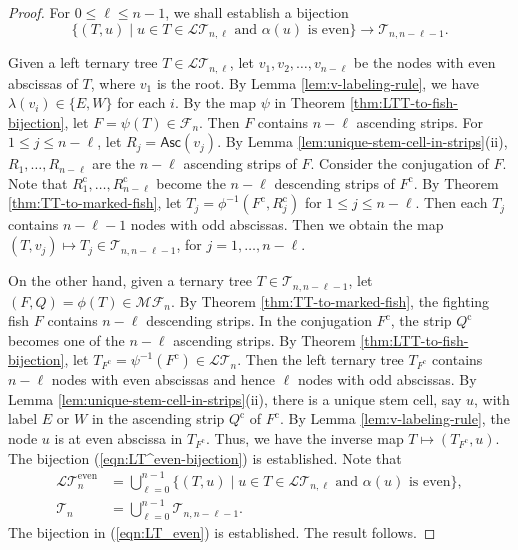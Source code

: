 \documentclass[10pt,a4paper]{amsart}
\newcommand{\Asc}{{\textsf{Asc}}}
\newcommand{\F}{{\mathcal{F}}}
\newcommand{\LT}{{\mathcal{LT}}}
\newcommand{\MF}{{\mathcal{MF}}}
\newcommand{\T}{{\mathcal{T}}}
\newcommand{\cc}{{\mathrm{c}}}
\newcommand{\even}{{\textrm{even}}}
\begin{document}
\begin{proof}
For $0\le \ell\le n-1$, we shall establish a bijection
\begin{equation} \label{eqn:LT^even-bijection}
\{(T,u)\mid u\in T\in\LT_{n,\ell}\mbox{ and $\alpha(u)$ is even}\}\rightarrow\T_{n,n-\ell-1}.
\end{equation}

Given a left ternary tree $T\in\LT_{n,\ell}$, let $v_1,v_2,\dots,v_{n-\ell}$ be the nodes with even abscissas of $T$, where $v_1$ is the root. By Lemma \ref{lem:v-labeling-rule}, we have $\lambda(v_i)\in\{E,W\}$ for each $i$. By the map $\psi$ in Theorem \ref{thm:LTT-to-fish-bijection}, let $F=\psi(T)\in\F_n$. Then $F$ contains $n-\ell$ ascending strips.
For $1\le j\le n-\ell$, let $R_j=\Asc(v_j)$.
By Lemma \ref{lem:unique-stem-cell-in-strips}(ii), $R_1,\dots,R_{n-\ell}$ are the $n-\ell$ ascending strips of $F$. Consider the conjugation of $F$. Note that $R^{\cc}_1,\dots,R^{\cc}_{n-\ell}$ become the $n-\ell$ descending strips of $F^{\cc}$.  By Theorem \ref{thm:TT-to-marked-fish}, let $T_j=\phi^{-1}(F^{\cc},R^{\cc}_j)$ for $1\le j\le n-\ell$. Then each $T_j$ contains $n-\ell-1$ nodes with odd abscissas. Then we obtain the map $(T,v_j)\mapsto T_j\in\T_{n,n-\ell-1}$, for $j=1,\dots, n-\ell$.

On the other hand, given a ternary tree $T\in\T_{n,n-\ell-1}$, let $(F,Q)=\phi(T)\in\MF_n$. By Theorem \ref{thm:TT-to-marked-fish}, the fighting fish $F$ contains $n-\ell$ descending strips. In the conjugation  $F^{\cc}$, the strip $Q^{\cc}$ becomes one of the $n-\ell$ ascending strips.  By Theorem \ref{thm:LTT-to-fish-bijection}, let $T_{F^{\cc}}=\psi^{-1}(F^{\cc})\in\LT_n$. Then the left ternary tree $T_{F^{\cc}}$ contains $n-\ell$ nodes with even abscissas and hence $\ell$ nodes with odd abscissas. By Lemma \ref{lem:unique-stem-cell-in-strips}(ii), there is a unique stem cell, say $u$, with label $E$ or $W$ in the ascending strip $Q^{\cc}$ of $F^{\cc}$. By Lemma \ref{lem:v-labeling-rule}, the node $u$ is at even abscissa in $T_{F^{\cc}}$. Thus, we have the inverse map $T\mapsto (T_{F^{\cc}},u)$. The bijection (\ref{eqn:LT^even-bijection}) is established. Note that
\begin{align*}
\LT_n^{\even} &= \bigcup_{\ell=0}^{n-1} 
\{(T,u)\mid u\in T\in\LT_{n,\ell}\mbox{ and $\alpha(u)$ is even}\}, \\
\T_n &= \bigcup_{\ell=0}^{n-1} \T_{n,n-\ell-1}.
\end{align*}
The bijection in (\ref{eqn:LT_even}) is established. The result follows.
\end{proof}
\end{document}
